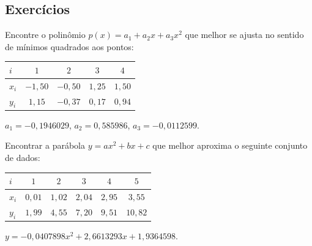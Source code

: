 % 
% 

\subsection*{Exercícios}

\begin{exer}
  Encontre o polinômio $p(x) = a_1 + a_2x + a_3x^2$ que melhor se ajusta no sentido de mínimos quadrados aos pontos:
  \begin{center}
    \begin{tabular}{l|cccc}
      $i$ & $1$ & $2$ & $3$ & $4$ \\\hline
      $x_i$ & $-1,50$ & $-0,50$ & $1,25$ & $1,50$\\
      $y_i$ & $1,15$ & $-0,37$ & $0,17$ & $0,94$
  \end{tabular} 
    \end{center}
\end{exer}
\begin{resp}
    $a_1 = -0,1946029$, $a_2 = 0,585986$, $a_3 = -0,0112599$. 
\end{resp}

\begin{exer}Encontrar a parábola $y=ax^2+bx+c$ que melhor aproxima o seguinte conjunto de dados:
  \begin{center}
    \begin{tabular}{l|ccccc}
      $i$ & $1$ & $2$ & $3$ & $4$ & $5$ \\\hline
      $x_i$ & $0,01$ & $1,02$ & $2,04$ & $2,95$ & $3,55$\\
      $y_i$ & $1,99$ & $4,55$ & $7,20$ & $9,51$ & $10,82$
    \end{tabular}
  \end{center} 
\end{exer}
\begin{resp}  
    $y=-0,0407898x^2+ 2,6613293x+ 1,9364598$.
\end{resp}

